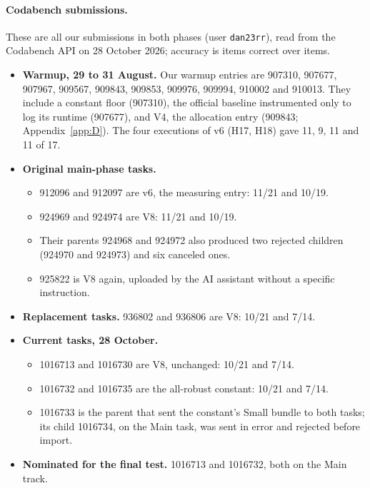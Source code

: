 \paragraph{Codabench submissions.} These are all our submissions in both phases (user \texttt{dan23rr}), read from the Codabench API on 28 October 2026; accuracy is items correct over items.
\begin{itemize}
\item \textbf{Warmup, 29 to 31 August.} Our warmup entries are 907310, 907677, 907967, 909567, 909843, 909853, 909976, 909994, 910002 and 910013. They include a constant floor (907310), the official baseline instrumented only to log its runtime (907677), and V4, the allocation entry (909843; Appendix~\ref{app:D}). The four executions of v6 (H17, H18) gave 11, 9, 11 and 11 of 17.
\item \textbf{Original main-phase tasks.}
  \begin{itemize}
  \item 912096 and 912097 are v6, the measuring entry: 11/21 and 10/19.
  \item 924969 and 924974 are V8: 11/21 and 10/19.
  \item Their parents 924968 and 924972 also produced two rejected children (924970 and 924973) and six canceled ones.
  \item 925822 is V8 again, uploaded by the AI assistant without a specific instruction.
  \end{itemize}
\item \textbf{Replacement tasks.} 936802 and 936806 are V8: 10/21 and 7/14.
\item \textbf{Current tasks, 28 October.}
  \begin{itemize}
  \item 1016713 and 1016730 are V8, unchanged: 10/21 and 7/14.
  \item 1016732 and 1016735 are the all-robust constant: 10/21 and 7/14.
  \item 1016733 is the parent that sent the constant's Small bundle to both tasks; its child 1016734, on the Main task, was sent in error and rejected before import.
  \end{itemize}
\item \textbf{Nominated for the final test.} 1016713 and 1016732, both on the Main track.
\end{itemize}

